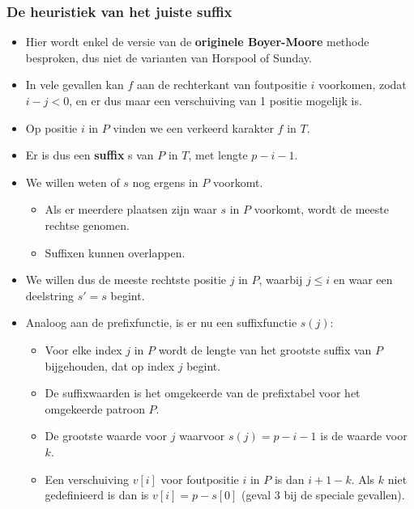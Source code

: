 \subsubsection{De heuristiek van het juiste suffix}
\begin{itemize}
    \item Hier wordt enkel de versie van de \textbf{originele Boyer-Moore} methode besproken, dus niet de varianten van Horspool of Sunday.
    \item In vele gevallen kan $f$ aan de rechterkant van foutpositie $i$ voorkomen, zodat $i - j < 0$, en er dus maar een verschuiving van 1 positie mogelijk is.
    \item Op positie $i$ in $P$ vinden we een verkeerd karakter $f$ in $T$.
    \item Er is dus een \textbf{suffix} s van $P$ in $T$, met lengte $p - i - 1$.
    \item We willen weten of $s$ nog ergens in $P$ voorkomt.
    \begin{itemize}
        \item Als er meerdere plaatsen zijn waar $s$ in $P$ voorkomt, wordt de meeste rechtse genomen.
        \item Suffixen kunnen overlappen.
    \end{itemize}
    \item We willen dus de meeste rechtste positie $j$ in $P$, waarbij $j \leq i$ en waar een deelstring $s' = s$ begint.
    \item Analoog aan de prefixfunctie, is er nu een suffixfunctie $s(j)$:
    \begin{itemize}
        \item Voor elke index $j$ in $P$ wordt de lengte van het grootste suffix van $P$ bijgehouden, dat op index $j$ begint.
        \item De suffixwaarden is het omgekeerde van de prefixtabel voor het omgekeerde patroon $P$.
        \item De grootste waarde voor $j$ waarvoor $s(j) = p - i - 1$ is de waarde voor $k$.
        \item Een verschuiving $v[i]$ voor foutpositie $i$ in $P$ is dan $i + 1 - k$. Als $k$ niet gedefinieerd is dan is $v[i] = p - s[0]$ (geval 3 bij de speciale gevallen).
    \end{itemize}



\end{itemize}
